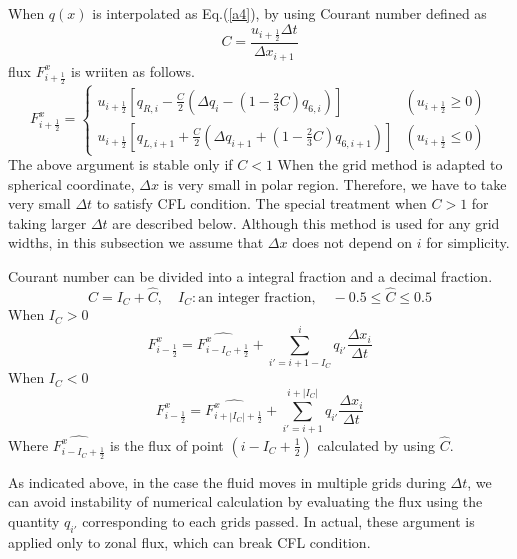 When $q(x)$ is interpolated as Eq.(\ref{a4}), by using Courant number defined as
\begin{equation}
  C=\frac{u_{i+\frac{1}{2}}\Delta t}{\Delta x_{i+1}}
\end{equation}
flux $F^{x}_{i+\frac{1}{2}}$ is wriiten as follows.
\begin{equation}
  F^{x}_{i+\frac{1}{2}}=\begin{cases}u_{i+\frac{1}{2}}[q_{R,i}-\frac{C}{2}(\Delta q_{i}-(1-\frac{2}{3}C)q_{6,i})] & (u_{i+\frac{1}{2}}\ge0)\\
  u_{i+\frac{1}{2}}[q_{L,i+1}+\frac{C}{2}(\Delta q_{i+1}+(1-\frac{2}{3}C)q_{6,i+1})] & (u_{i+\frac{1}{2}}\leq0)
  \end{cases}
\end{equation}
The above argument is stable only if $C<1$
When the grid method is adapted to spherical coordinate, $\Delta x$ is very small in polar region.
Therefore, we have to take very small $\Delta t$ to satisfy CFL condition.
The special treatment when $C>1$ for taking larger $\Delta t$ are described below.
Although this method is used for any grid widths, in this subsection we assume that $\Delta x$ does not depend on $i$ for simplicity.

Courant number can be divided into a integral fraction and a decimal fraction.
\begin{equation}
  C=I_{C}+\hat{C},\quad I_{C}: \text{an integer fraction},\quad -0.5\le \hat{C} \le 0.5
\end{equation}
When $I_{C}>0$
\begin{equation}
  F^{x}_{i-\frac{1}{2}}=\hat{F^{x}_{i-I_{C}+\frac{1}{2}}}+\sum^{i}_{i'=i+1-I_{C}} q_{i'} \frac{\Delta x_{i}}{\Delta t}
\end{equation}
When $I_{C}<0$
\begin{equation}
  F^{x}_{i-\frac{1}{2}}=\hat{F^{x}_{i+|I_{C}|+\frac{1}{2}}}+\sum^{i+|I_{C}|}_{i'=i+1} q_{i'} \frac{\Delta x_{i}}{\Delta t}
\end{equation}
Where $\hat{F^{x}_{i-I_{C}+\frac{1}{2}}}$ is the flux of point $(i-I_{C}+\frac{1}{2})$ calculated by using $\hat{C}$.

As indicated above, in the case the fluid moves in multiple grids during $\Delta t$, we can avoid instability of numerical calculation by evaluating the flux using the quantity $q_{i'}$ corresponding to each grids passed.
In actual, these argument is applied only to zonal flux, which can break CFL condition.

